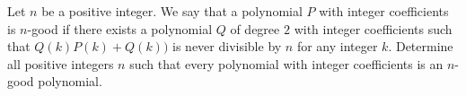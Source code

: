 Let $n$ be a positive integer. We say that a polynomial $P$ with integer coefficients is $n$-good if there exists a polynomial $Q$ of degree $2$ with integer coefficients such that $Q(k)P(k) + Q(k))$ is never divisible by $n$ for any integer $k$. Determine all positive integers $n$ such that every polynomial with integer coefficients is an $n$-good polynomial.
